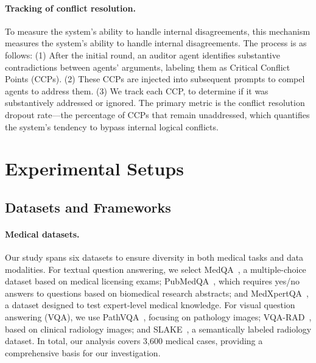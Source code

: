 \documentclass{article}
\begin{document}
\paragraph{Tracking of conflict resolution.}
To measure the system's ability to handle internal disagreements, this mechanism measures the system's ability to handle internal disagreements. The process is as follows: (1) After the initial round, an auditor agent identifies substantive contradictions between agents' arguments, labeling them as Critical Conflict Points (CCPs). (2) These CCPs are injected into subsequent prompts to compel agents to address them. (3) We track each CCP, to determine if it was substantively addressed or ignored. The primary metric is the conflict resolution dropout rate—the percentage of CCPs that remain unaddressed, which quantifies the system's tendency to bypass internal logical conflicts.

\section{Experimental Setups}

\subsection{Datasets and Frameworks}

\paragraph{Medical datasets.}
Our study spans six datasets to ensure diversity in both medical tasks and data modalities. For textual question answering, we select MedQA~\cite{jin2021medqa}, a multiple-choice dataset based on medical licensing exams; PubMedQA~\cite{jin2019pubmedqa}, which requires yes/no answers to questions based on biomedical research abstracts; and MedXpertQA~\cite{zuo2025medxpertqa}, a dataset designed to test expert-level medical knowledge. For visual question answering (VQA), we use PathVQA~\cite{he2020pathvqa}, focusing on pathology images; VQA-RAD~\cite{lau2018VQA_RAD}, based on clinical radiology images; and SLAKE~\cite{liu2021slake}, a semantically labeled radiology dataset. In total, our analysis covers 3,600 medical cases, providing a comprehensive basis for our investigation.
\end{document}
